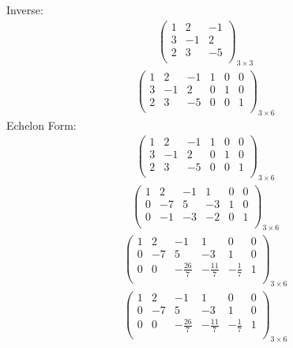 \documentclass{article}
\begin{document}
Inverse:\\
\begin{align*}
\begin{pmatrix}
1 & 2 & -1\\
3 & -1 & 2\\
2 & 3 & -5\\
\end{pmatrix}_{3\times 3}
\end{align*}
\begin{align*}
\left(
\begin{array}{ccc|ccc}
1 & 2 & -1 & 1 & 0 & 0\\
3 & -1 & 2 & 0 & 1 & 0\\
2 & 3 & -5 & 0 & 0 & 1\\
\end{array}
\right)_{3\times 6}
\end{align*}
Echelon Form:\\
\begin{align*}
\left(
\begin{array}{ccc|ccc}
1 & 2 & -1 & 1 & 0 & 0\\
3 & -1 & 2 & 0 & 1 & 0\\
2 & 3 & -5 & 0 & 0 & 1\\
\end{array}
\right)_{3\times 6}
\end{align*}
\begin{align*}
\left(
\begin{array}{ccc|ccc}
1 & 2 & -1 & 1 & 0 & 0\\
0 & -7 & 5 & -3 & 1 & 0\\
0 & -1 & -3 & -2 & 0 & 1\\
\end{array}
\right)_{3\times 6}
\end{align*}
\begin{align*}
\left(
\begin{array}{ccc|ccc}
1 & 2 & -1 & 1 & 0 & 0\\
0 & -7 & 5 & -3 & 1 & 0\\
0 & 0 & -\frac{26}{7} & -\frac{11}{7} & -\frac{1}{7} & 1\\
\end{array}
\right)_{3\times 6}
\end{align*}
\begin{align*}
\left(
\begin{array}{ccc|ccc}
1 & 2 & -1 & 1 & 0 & 0\\
0 & -7 & 5 & -3 & 1 & 0\\
0 & 0 & -\frac{26}{7} & -\frac{11}{7} & -\frac{1}{7} & 1\\
\end{array}
\right)_{3\times 6}
\end{align*}
\end{document}
